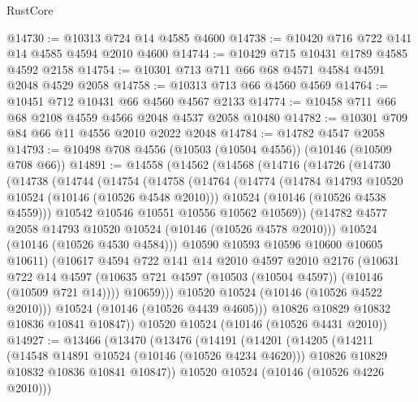\begin{lexlean}{RustCore}
\begin{coremodule}
@14730 := @10313 @724 @14 @4585 @4600
@14738 := @10420 @716 @722 @141 @14 @4585 @4594 @2010 @4600
@14744 := @10429 @715 @10431 @1789 @4585 @4592 @2158
@14754 := @10301 @713 @711 @66 @68 @4571 @4584 @4591 @2048 @4529 @2058
@14758 := @10313 @713 @66 @4560 @4569
@14764 := @10451 @712 @10431 @66 @4560 @4567 @2133
@14774 := @10458 @711 @66 @68 @2108 @4559 @4566 @2048 @4537 @2058 @10480
@14782 := @10301 @709 @84 @66 @11 @4556 @2010 @2022 @2048
@14784 := @14782 @4547 @2058
@14793 := @10498 @708 @4556 (@10503 (@10504 @4556)) (@10146 (@10509 @708 @66))
@14891 := @14558
    (@14562
      (@14568
        (@14716
          (@14726
            (@14730
              (@14738
                (@14744
                  (@14754
                    (@14758
                      (@14764
                        (@14774
                          (@14784 @14793 @10520 @10524 (@10146 (@10526 @4548 @2010)))
                          @10524
                          (@10146 (@10526 @4538 @4559)))
                        @10542
                        @10546
                        @10551
                        @10556
                        @10562
                        @10569))
                    (@14782 @4577 @2058 @14793 @10520 @10524 (@10146 (@10526 @4578 @2010)))
                    @10524
                    (@10146 (@10526 @4530 @4584)))
                  @10590
                  @10593
                  @10596
                  @10600
                  @10605
                  @10611)
                (@10617
                  @4594
                  @722
                  @141
                  @14
                  @2010
                  @4597
                  @2010
                  @2176
                  (@10631
                    @722
                    @14
                    @4597
                    (@10635 @721 @4597 (@10503 (@10504 @4597)) (@10146 (@10509 @721 @14))))
                  @10659)))
            @10520
            @10524
            (@10146 (@10526 @4522 @2010)))
          @10524
          (@10146 (@10526 @4439 @4605)))
        @10826
        @10829
        @10832
        @10836
        @10841
        @10847))
    @10520
    @10524
    (@10146 (@10526 @4431 @2010))
@14927 := @13466
    (@13470
      (@13476
        (@14191
          (@14201
            (@14205
              (@14211
                (@14548 @14891 @10524 (@10146 (@10526 @4234 @4620)))
                @10826
                @10829
                @10832
                @10836
                @10841
                @10847))
            @10520
            @10524
            (@10146 (@10526 @4226 @2010)))

\end{coremodule}
\end{lexlean}
